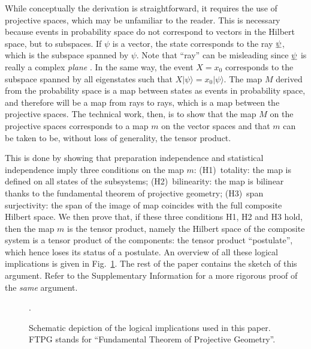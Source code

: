 \documentclass[aps,prl,amsmath,amssymb,twocolumn,nofootinbib]{revtex4}
\theoremstyle{plain}
\theoremstyle{definition}
\theoremstyle{remark}
\newcommand{\pj}[1] {\underbar{$#1$}}
\def\>{\rangle}
\begin{document}
	While conceptually the derivation is straightforward, it requires the
	use of projective spaces, which may be unfamiliar to the reader. This is
	necessary because events in probability space do not correspond to vectors in the Hilbert space, but to subspaces. If $\psi$ is a vector, the state corresponds to the ray $\pj{\psi}$, which is the subspace spanned by $\psi$. Note that ``ray'' can be misleading since $\pj{\psi}$ is really a complex { \em plane }. In the same way, the event $X = x_0$ corresponds to the subspace spanned by all eigenstates such that $X | \psi \> = x_0 |\psi\>$. The map $M$ derived from the probability space is a map between states as events in probability space, and therefore will be a map from rays to rays, which is a map between the projective spaces. The technical work, then, is to show that the map $M$ on the projective spaces corresponds to a map $m$ on the vector spaces and that $m$ can be taken to be, without loss of generality, the tensor product.
	
	This is done by showing that preparation independence and
	statistical independence imply three conditions on the map $m$:
	(H1)~totality: the map is defined on all states of the subsystems;
	(H2)~bilinearity: the map is bilinear thanks to the fundamental
	theorem of projective geometry; (H3)~span surjectivity: the span of
	the image of map coincides with the full composite Hilbert space.  We
	then prove that, if these three conditions H1, H2 and H3 hold, then
	the map $m$ is the tensor product, namely the Hilbert space of the
	composite system is a tensor product of the components: the tensor
	product ``postulate'', which hence loses its status of a postulate. An
	overview of all these logical implications is given in
	Fig.~\ref{f:fig}. The rest of the paper contains the sketch of this
	argument. Refer to the Supplementary Information for a more rigorous
	proof of the \emph{same} argument.
	
	\begin{figure}[ht]
		.\hsize\leavevmode{}
		\caption{Schematic depiction of the logical implications used
			in this paper. FTPG stands for ``Fundamental Theorem of Projective Geometry''.  \label{f:fig}}\end{figure}
	
\end{document}
